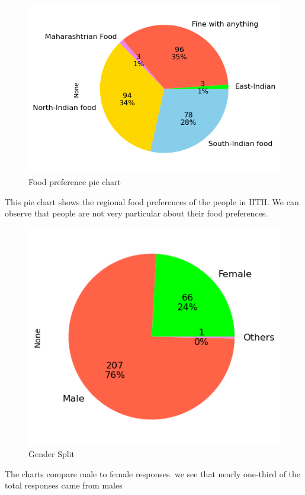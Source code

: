 \documentclass{article}
\begin{document}
\begin{figure}[H]
    \centering
    \includegraphics[scale = 0.9]{pie_food_pref.png}
    \caption{Food preference pie chart}  
    \label{Normality_plot}
\end{figure}
This pie chart shows the regional food preferences of the people in IITH. We can observe that people are not very particular about their food preferences.
\begin{figure}[H]
    \centering
    \includegraphics[scale = 0.9]{pie_gender.png}
    \caption{Gender Split}  
    \label{Normality_plot}
\end{figure}
The charts compare male to female responses. we see that nearly one-third of the total responses came from males
\end{document}
